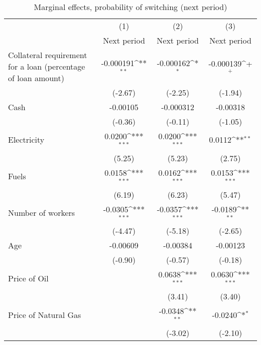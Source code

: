 \begin{table}[htbp]\centering
\def\sym#1{\ifmmode^{#1}\else\(^{#1}\)\fi}
\caption{Marginal effects, probability of switching (next period)}
\begin{tabular}{l*{3}{c}}
\hline\hline
                    &\multicolumn{1}{c}{(1)}&\multicolumn{1}{c}{(2)}&\multicolumn{1}{c}{(3)}\\
                    &\multicolumn{1}{c}{Next period}&\multicolumn{1}{c}{Next period}&\multicolumn{1}{c}{Next period}\\
\hline
Collateral requirement for a loan (percentage of loan amount)&   -0.000191\sym{**} &   -0.000162\sym{*}  &   -0.000139\sym{+}  \\
                    &     (-2.67)         &     (-2.25)         &     (-1.94)         \\
[1em]
Cash                &    -0.00105         &   -0.000312         &    -0.00318         \\
                    &     (-0.36)         &     (-0.11)         &     (-1.05)         \\
[1em]
Electricity         &      0.0200\sym{***}&      0.0200\sym{***}&      0.0112\sym{**} \\
                    &      (5.25)         &      (5.23)         &      (2.75)         \\
[1em]
Fuels               &      0.0158\sym{***}&      0.0162\sym{***}&      0.0153\sym{***}\\
                    &      (6.19)         &      (6.23)         &      (5.47)         \\
[1em]
Number of workers   &     -0.0305\sym{***}&     -0.0357\sym{***}&     -0.0189\sym{**} \\
                    &     (-4.47)         &     (-5.18)         &     (-2.65)         \\
[1em]
Age                 &    -0.00609         &    -0.00384         &    -0.00123         \\
                    &     (-0.90)         &     (-0.57)         &     (-0.18)         \\
[1em]
Price of Oil        &                     &      0.0638\sym{***}&      0.0630\sym{***}\\
                    &                     &      (3.41)         &      (3.40)         \\
[1em]
Price of Natural Gas&                     &     -0.0348\sym{**} &     -0.0240\sym{*}  \\
                    &                     &     (-3.02)         &     (-2.10)         \\

\end{tabular}
\end{table}

